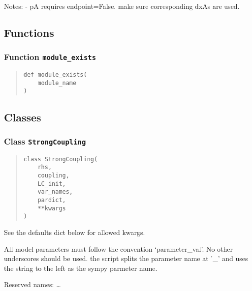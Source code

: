 \documentclass[english,a4paper,oneside]{article}
\begin{document}
Notes: - pA requires endpoint=False. make sure corresponding dxAs are
used.

\subsection{Functions}\label{functions}

\subsubsection{\texorpdfstring{Function
\texttt{module\_exists}}{Function module\_exists}}\label{StrongCoupling.module_exists}

\begin{quote}
\begin{verbatim}
def module_exists(
    module_name
)
\end{verbatim}
\end{quote}

\subsection{Classes}\label{classes}

\subsubsection{\texorpdfstring{Class
\texttt{StrongCoupling}}{Class StrongCoupling}}\label{StrongCoupling.StrongCoupling}

\begin{quote}
\begin{verbatim}
class StrongCoupling(
    rhs,
    coupling,
    LC_init,
    var_names,
    pardict,
    **kwargs
)
\end{verbatim}
\end{quote}

See the defaults dict below for allowed kwargs.

All model parameters must follow the convention `parameter\_val'. No
other underscores should be used. the script splits the parameter name
at '\_' and uses the string to the left as the sympy parmeter name.

Reserved names: \ldots{}
\end{document}
